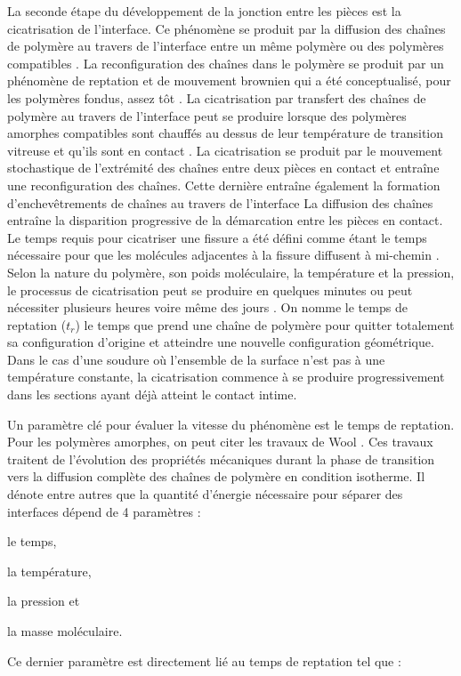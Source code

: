 La seconde étape du développement de la jonction entre les pièces est la cicatrisation de l'interface. 
Ce phénomène se produit par la diffusion des chaînes de polymère au travers de l'interface entre un même polymère ou des polymères compatibles \cite{Jud1981b}. 
La reconfiguration des chaînes dans le polymère se produit par un phénomène de reptation et de mouvement brownien qui a été conceptualisé, pour les polymères fondus, assez tôt \cite{DeGennes1971,Edwards1978b,Klein1978,Daoud1979}. 
La cicatrisation par transfert des chaînes de polymère au travers de l'interface peut se produire lorsque des polymères amorphes compatibles sont chauffés au dessus de leur température de transition vitreuse et qu'ils sont en contact \cite{Jud1981a,Prager1981a}. 
La cicatrisation se produit par le mouvement stochastique de l'extrémité des chaînes entre deux pièces en contact et entraîne une reconfiguration des chaînes. 
Cette dernière entraîne également la formation d'enchevêtrements de chaînes au travers de l'interface \cite{Wool1983}
La diffusion des chaînes entraîne la disparition progressive de la démarcation entre les pièces en contact. 
Le temps requis pour cicatriser une fissure a été défini comme étant le temps nécessaire pour que les molécules adjacentes à la fissure diffusent à mi-chemin \cite{Prager1981a}.
Selon la nature du polymère, son poids moléculaire, la température et la pression, le processus de cicatrisation peut se produire en quelques minutes ou peut nécessiter plusieurs heures voire même des jours \cite{Prager1981a}. 
On nomme le temps de reptation ($t_r$) le temps que prend une chaîne de polymère pour quitter totalement sa configuration d'origine et atteindre une nouvelle configuration géométrique. 
Dans le cas d'une soudure où l'ensemble de la surface n'est pas à une température constante, la cicatrisation commence à se produire progressivement dans les sections ayant déjà atteint le contact intime. 

Un paramètre clé pour évaluer la vitesse du phénomène est le temps de reptation. 
Pour les polymères amorphes, on peut citer les travaux de Wool \cite{Wool1983,Wool1989}. 
Ces travaux traitent de l'évolution des propriétés mécaniques durant la phase de transition vers la diffusion complète des chaînes de polymère en condition isotherme. 
Il dénote entre autres que la quantité d'énergie nécessaire pour séparer des interfaces dépend de 4 paramètres : \begin{inparaenum}[(1)]
	\item le temps, 
	\item la température, 
	\item la pression et
	\item la masse moléculaire. 
\end{inparaenum}
Ce dernier paramètre est directement lié au temps de reptation tel que : 

